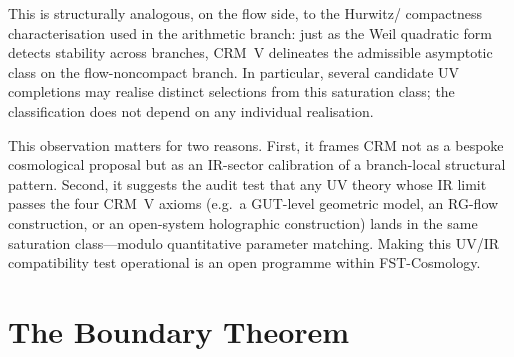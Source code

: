 \documentclass[11pt]{article}
\theoremstyle{definition}
\theoremstyle{remark}
\begin{document}
This is structurally analogous, on the flow side, to the Hurwitz/
compactness characterisation used in the arithmetic branch: just as
the Weil quadratic form detects stability across branches, CRM~V
delineates the admissible asymptotic class on the flow-noncompact
branch. In particular, several candidate UV completions may
realise distinct selections from this saturation class; the
classification does not depend on any individual realisation.

This observation matters for two reasons. First, it frames CRM not
as a bespoke cosmological proposal but as an IR-sector calibration of a
branch-local structural pattern. Second, it suggests the audit test that any UV
theory whose IR limit passes the four CRM~V axioms (e.g.\ a
GUT-level geometric model, an RG-flow construction, or an
open-system holographic construction) lands in the same saturation
class---modulo quantitative parameter matching. Making this
UV/IR compatibility test operational is an open programme within
FST-Cosmology.

\section{The Boundary Theorem}
\label{sec:boundary}
\end{document}
